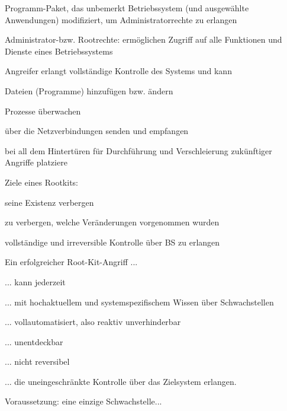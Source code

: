 \documentclass[a4paper]{article}
\begin{document}
\begin{multicols}{3}
    \begin{itemize*}
        \item
        Programm-Paket, das unbemerkt Betriebssystem (und ausgewählte
        Anwendungen) modifiziert, um Administratorrechte zu erlangen
        \begin{itemize*}
            \item Administrator-bzw. Rootrechte: ermöglichen Zugriff auf alle Funktionen und Dienste eines Betriebssystems
            \item Angreifer erlangt vollständige Kontrolle des Systems und kann \begin{itemize*} \item Dateien (Programme) hinzufügen bzw. ändern \item Prozesse überwachen \item über die Netzverbindungen senden und empfangen \item bei all dem Hintertüren für Durchführung und Verschleierung zukünftiger Angriffe platziere \end{itemize*}
            \item Ziele eines Rootkits: \begin{itemize*} \item seine Existenz verbergen \item zu verbergen, welche Veränderungen vorgenommen wurden \item vollständige und irreversible Kontrolle über BS zu erlangen \end{itemize*}
        \end{itemize*}
        \item
        Ein erfolgreicher Root-Kit-Angriff ...
        \begin{itemize*}
            \item ... kann jederzeit
            \item ... mit hochaktuellem und systemspezifischem Wissen über Schwachstellen
            \item ... vollautomatisiert, also reaktiv unverhinderbar
            \item ... unentdeckbar
            \item ... nicht reversibel
            \item ... die uneingeschränkte Kontrolle über das Zielsystem erlangen.
        \end{itemize*}
        \item
        Voraussetzung: eine einzige Schwachstelle...
    \end{itemize*}



\end{multicols}
\end{document}
